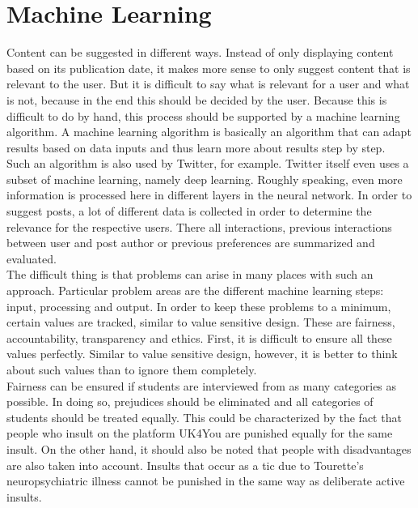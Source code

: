 \section{Machine Learning}\label{sec:ai}
Content can be suggested in different ways.
Instead of only displaying content based on its publication date, it makes more sense to only suggest content that is relevant to the user.
But it is difficult to say what is relevant for a user and what is not, because in the end this should be decided by the user.
Because this is difficult to do by hand, this process should be supported by a machine learning algorithm.
A machine learning algorithm is basically an algorithm that can adapt results based on data inputs and thus learn more about results step by step.\\

Such an algorithm is also used by Twitter, for example\cite{twitter-deep-learning}.
Twitter itself even uses a subset of machine learning, namely deep learning.
Roughly speaking, even more information is processed here in different layers in the neural network.
In order to suggest posts, a lot of different data is collected in order to determine the relevance for the respective users.
There all interactions, previous interactions between user and post author or previous preferences are summarized and evaluated.\\

The difficult thing is that problems can arise in many places with such an approach.
Particular problem areas are the different machine learning steps: input, processing and output.
In order to keep these problems to a minimum, certain values are tracked, similar to value sensitive design.
These are fairness, accountability, transparency and ethics.
First, it is difficult to ensure all these values perfectly.
Similar to value sensitive design, however, it is better to think about such values than to ignore them completely.\\

Fairness can be ensured if students are interviewed from as many categories as possible.
In doing so, prejudices should be eliminated and all categories of students should be treated equally\cite{fairness-framework}.
This could be characterized by the fact that people who insult on the platform UK4You are punished equally for the same insult.
On the other hand, it should also be noted that people with disadvantages are also taken into account.
Insults that occur as a tic due to Tourette's neuropsychiatric illness cannot be punished in the same way as deliberate active insults.\\

